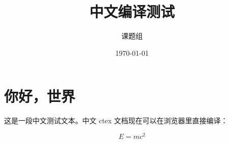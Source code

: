 \documentclass[11pt,a4paper]{ctexart}
\title{中文编译测试}
\author{课题组}
\date{\today}
\begin{document}
\maketitle

\section{你好，世界}

这是一段中文测试文本。中文 ctex 文档现在可以在浏览器里直接编译：

\begin{equation}
  E = mc^2
\end{equation}
\end{document}
